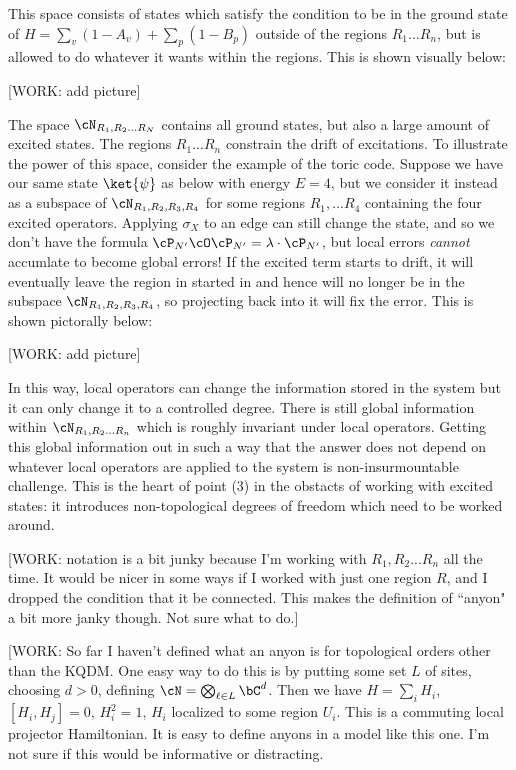This space consists of states which satisfy the condition to be in the ground state of $H=\sum_{v}(1-A_v)+\sum_p(1-B_p)$ outside of the regions  $R_1...R_n$, but is allowed to do whatever it wants within the regions. This is shown visually below:

[WORK: add picture]

The space $\cN_{R_1,R_2... R_N}$ contains all ground states, but also a large amount of excited states. The regions $R_1... R_n$ constrain the drift of excitations. To illustrate the power of this space, consider the example of the toric code. Suppose we have our same state $\ket{\psi}$ as below with energy $E=4$, but we consider it instead as a subspace of $\cN_{R_1,R_2,R_3,R_4}$ for some regions $R_1,...R_4$ containing the four excited operators. Applying $\sigma_X$ to an edge can still change the state, and so we don't have the formula $\cP_{N'}\cO \cP_{N'}=\lambda\cdot \cP_{N'}$, but local errors \textit{cannot} accumlate to become global errors! If the excited term starts to drift, it will eventually leave the region in started in and hence will no longer be in the subspace $\cN_{R_1,R_2,R_3,R_4}$, so projecting back into it will fix the error. This is shown pictorally below:

[WORK: add picture]

In this way, local operators can change the information stored in the system but it can only change it to a controlled degree. There is still global information within $\cN_{R_1,R_2... R_n}$ which is roughly invariant under local operators. Getting this global information out in such a way that the answer does not depend on whatever local operators are applied to the system is non-insurmountable challenge. This is the heart of point (3) in the obstacts of working with excited states: it introduces non-topological degrees of freedom which need to be worked around.

[WORK: notation is a bit junky because I'm working with $R_1,R_2... R_n$ all the time. It would be nicer in some ways if I worked with just one region $R$, and I dropped the condition that it be connected. This makes the definition of ``anyon" a bit more janky though. Not sure what to do.]

[WORK: So far I haven't defined what an anyon is for topological orders other than the KQDM. One easy way to do this is by putting some set $L$ of sites, choosing $d>0$, defining $\cN=\bigotimes_{\ell \in L}\bC^d$. Then we have $H=\sum_{i}H_i$, $[H_i,H_j]=0$, $H_i^2=1$, $H_i$ localized to some region $U_i$. This is a commuting local projector Hamiltonian. It is easy to define anyons in a model like this one. I'm not sure if this would be informative or distracting.

